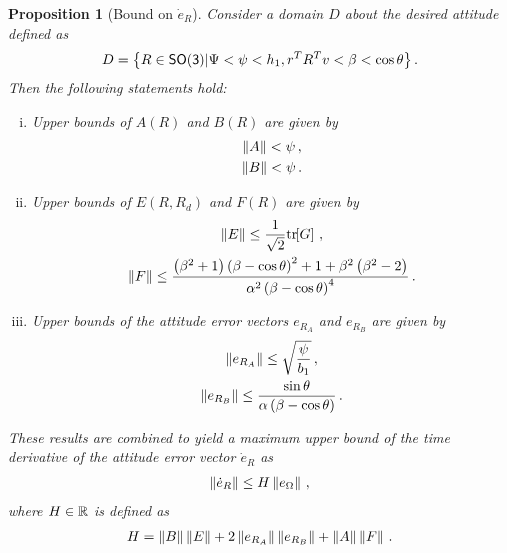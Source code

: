 \documentclass[letterpaper, 10 pt, conference]{ieeeconf}  %
\newtheorem{prop}{Proposition}
\begin{document}
\begin{prop}[Bound on \( \dot{e}_R \)]\label{prop:eR_dot_bound}
Consider a domain \( D \) about the desired attitude defined as
\begin{align}
	D = \left\{ R \in \mathsf{SO(3)} \vert \Psi < \psi < h_1, r^T R^T v < \beta < \cos \theta \right\}. \label{eqn:domain}
\end{align}
Then the following statements hold:
\begin{enumerate}[(i)]
	\item \label{item:prop_eR_dot_bound_AB} Upper bounds of \( A(R) \) and \( B(R) \) are given by
	\begin{gather}
		\left\| A \right\| < \psi \, , \label{eqn:A_bound}\\
		\left\| B \right\| < \psi \, . \label{eqn:B_bound}
	\end{gather}
	\item \label{item:prop_eR_dot_bound_EF} Upper bounds of \( E(R,R_d) \) and \( F(R) \) are given by
	\begin{gather}
		\left\| E \right\| \leq \frac{1}{\sqrt{2}} \mathrm{tr}\negthickspace\left[ G \right] \, , \label{eqn:E_bound} \\
		\left\| F \right\| \leq \frac{\left( \beta^2 + 1 \right)\left( \beta - \cos \theta \right)^2 + 1 + \beta^2 \left( \beta^2-2 \right)}{\alpha^2 \left( \beta-\cos \theta \right)^4} \, . \label{eqn:F_bound}
	\end{gather}
	\item Upper bounds of the attitude error vectors \( e_{R_A} \) and \( e_{R_B} \) are given by
	\begin{gather}
		\left\| e_{R_A} \right\| \leq \sqrt{\frac{\psi}{b_1}} \, , \label{eqn:eRA_bound} \\
		\left\| e_{R_B} \right\| \leq \frac{\sin\theta}{\alpha \left( \beta - \cos \theta \right)} \, . \label{eqn:eRB_bound}
	\end{gather}
\end{enumerate}
These results are combined to yield a maximum upper bound of the time derivative of the attitude error vector \( \dot{e}_R \) as
\begin{gather}
	\left\| \dot{e}_R \right\| \leq H \left\| e_\Omega \right\| \, ,\label{eqn:eR_bound}
\end{gather}
where  \( H \in \mathbb{R} \) is defined as
\begin{gather}
	H = \left\| B \right\| \left\| E \right\| + 2 \left\| e_{R_A} \right\| \left\| e_{R_B} \right\| + \left\| A \right\|\left\| F \right\|\, . \label{eqn:H}
\end{gather}
\end{prop}
\end{document}
